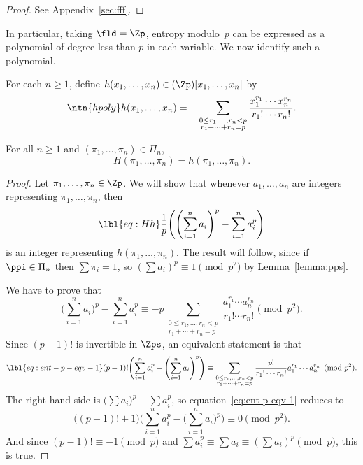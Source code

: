 \begin{proof}
See Appendix~\ref{sec:fff}.
\end{proof}

In particular, taking $\fld = \Zp$, entropy modulo~$p$ can be expressed as
a polynomial of degree less than $p$ in each variable.  We now 
identify such a polynomial.

For each $n \geq 1$, define $h(x_1, \ldots, x_n) \in (\Zp)[x_1, \ldots,
  x_n]$ by 
\[
\ntn{hpoly}
h(x_1, \ldots, x_n)
=
-\sum_{\substack{0 \leq r_1, \ldots, r_n < p\\ r_1 + \cdots + r_n = p}}
\frac{x_1^{r_1} \cdots x_n^{r_n}}{r_1! \cdots r_n!}.
\]

\begin{propn}
%
%
% 
For all $n \geq 1$ and $(\pi_1, \ldots, \pi_n) \in \Pi_n$,
\[
H(\pi_1, \ldots, \pi_n) 
=
h(\pi_1, \ldots, \pi_n).
\]
\end{propn}

\begin{proof}
Let $\pi_1, \ldots, \pi_n \in \Zp$.  We will show that whenever $a_1,
\ldots, a_n$ are integers representing $\pi_1, \ldots, \pi_n$, then
% 
\begin{equation}
\lbl{eq:Hh}
\frac{1}{p} \Biggl( 
\Biggl( \sum_{i = 1}^n a_i \Biggr)^p - \sum_{i = 1}^n a_i^p
\Biggr)
\end{equation}
% 
is an integer representing $h(\pi_1, \ldots, \pi_n)$.  The result will
follow, since if $\ppi \in \Pi_n$ then $\sum \pi_i = 1$, so $(\sum a_i)^p
\equiv 1 \pmod{p^2}$ by Lemma~\ref{lemma:pps}.

We have to prove that
\[
\Biggl( \sum_{i = 1}^n a_i \Biggr)^p - \sum_{i = 1}^n a_i^p 
\equiv
-p
\sum_{\substack{0 \leq r_1, \ldots, r_n < p\\ r_1 + \cdots + r_n = p}}
\frac{a_1^{r_1} \cdots a_n^{r_n}}{r_1! \cdots r_n!}
\pmod{p^2}.
\]
Since $(p - 1)!$ is invertible in $\Zps$, an equivalent statement is that
% 
\begin{equation}
\lbl{eq:ent-p-eqv-1}
(p - 1)! \Biggl( \sum_{i = 1}^n a_i^p  
- \Biggl( \sum_{i = 1}^n a_i \Biggr)^p \Biggr)
\equiv
\sum_{\substack{0 \leq r_1, \ldots, r_n < p\\ r_1 + \cdots + r_n = p}}
\frac{p!}{r_1! \cdots r_n!}
a_1^{r_1} \cdots a_n^{r_n}
\pmod{p^2}.
\end{equation}
% 
The right-hand side is $\bigl(\sum a_i\bigr)^p - \sum a_i^p$, so
equation~\eqref{eq:ent-p-eqv-1} reduces to
\[
\bigl( (p - 1)! + 1 \bigr)
\Biggl( \sum_{i = 1}^n a_i^p - \Biggl( \sum_{i = 1}^n a_i \Biggr)^p \Biggr)
\equiv
0
\pmod{p^2}.
\]
And since $(p - 1)! \equiv - 1 \pmod{p}$ and $\sum a_i^p \equiv \sum a_i
\equiv (\sum a_i)^p \pmod{p}$, this is true.
\end{proof}

